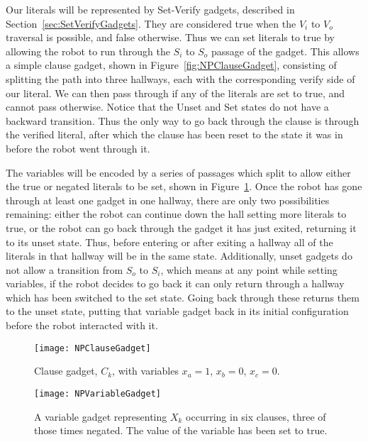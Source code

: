 Our literals will be represented by Set-Verify gadgets, described in Section~\ref{sec:SetVerifyGadgets}. They are considered true when the $V_i$ to $V_o$ traversal is possible, and false otherwise. Thus we can set literals to true by allowing the robot to run through the $S_i$ to $S_o$ passage of the gadget. This allows a simple clause gadget, shown in Figure~\ref{fig:NPClauseGadget}, consisting of splitting the path into three hallways, each with the corresponding verify side of our literal. We can then pass through if any of the literals are set to true, and cannot pass otherwise. Notice that the Unset and Set states do not have a backward transition. Thus the only way to go back through the clause is through the verified literal, after which the clause has been reset to the state it was in before the robot went through it.

The variables will be encoded by a series of passages which split to allow either the true or negated literals to be set, shown in Figure~\ref{fig:NPVariableGadget}. Once the robot has gone through at least one gadget in one hallway, there are only two possibilities remaining: either the robot can continue down the hall setting more literals to true, or the robot can go back through the gadget it has just exited, returning it to its unset state. Thus, before entering or after exiting a hallway all of the literals in that hallway will be in the same state. Additionally, unset gadgets do not allow a transition from $S_o$ to $S_i$, which means at any point while setting variables, if the robot decides to go back it can only return through a hallway which has been switched to the set state. Going back through these returns them to the unset state, putting that variable gadget back in its initial configuration before the robot interacted with it.



\begin{figure}[!ht]
\begin{minipage}{.36\textwidth}
    \texttt{[image: NPClauseGadget]}
    \caption{Clause gadget, $C_k$, with variables $x_a=1$, $x_b=0$, $x_c=0$.}
    \label{fig:NPClauseGadget}
\end{minipage}
\hspace{5mm}
\begin{minipage}{.57\textwidth}
  \centering
    \texttt{[image: NPVariableGadget]}
    \caption{A variable gadget representing $X_k$ occurring in six clauses, three of those times negated. The value of the variable has been set to true.}
    \label{fig:NPVariableGadget}
\end{minipage}
\end{figure}

